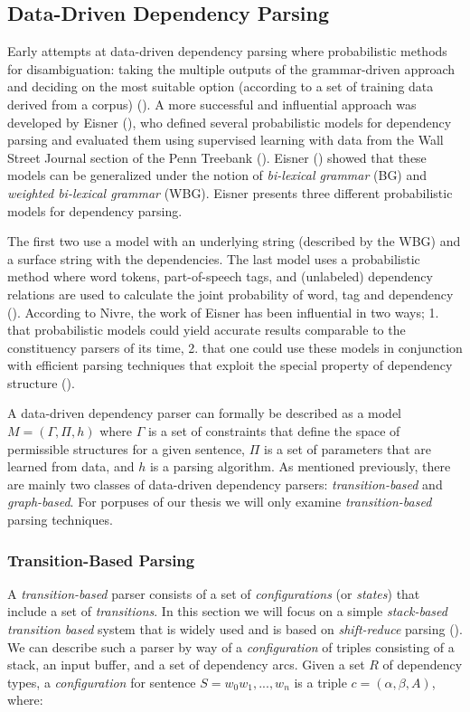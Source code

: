 \documentclass[10pt]{article}
\begin{document}
\subsection{Data-Driven Dependency Parsing}
Early attempts at data-driven dependency parsing where probabilistic methods for disambiguation: taking the multiple outputs of the grammar-driven approach and deciding on the most suitable option (according to a set of training data derived from a corpus) (\cite{Nivre05dependencygrammar}). A more successful and influential approach was developed by Eisner (\cite{eisner1996_a_empirical}), who defined several probabilistic models for dependency parsing and evaluated them using supervised learning with data from the Wall Street Journal section of the Penn Treebank (\cite{penn-treebank}). Eisner (\cite{eisner2000bilexical}) showed that these models can be generalized under the notion of \textit{bi-lexical grammar} (BG) and \textit{weighted bi-lexical grammar} (WBG). Eisner presents three different probabilistic models for dependency parsing.

The first two use a model with an underlying string (described by the WBG) and a surface string with the dependencies. The last model uses a probabilistic method where word tokens, part-of-speech tags, and (unlabeled) dependency relations are used to calculate the joint probability of word, tag and dependency (\cite{eisner2000bilexical}). According to Nivre, the work of Eisner has been influential in two ways; 1. that probabilistic models could yield accurate results comparable to the constituency parsers of its time, 2. that one could use these models in conjunction with efficient parsing techniques that exploit the special property of dependency structure (\cite{Nivre05dependencygrammar}).

A data-driven dependency parser can formally be described as a model $M = (\Gamma, \Pi, h)$ where $\Gamma$ is a set of constraints that define the space of permissible structures for a given sentence, $\Pi$ is a set of parameters that are learned from data, and $h$ is a parsing algorithm. As mentioned previously, there are mainly two classes of data-driven dependency parsers: \textit{transition-based} and \textit{graph-based}. For porpuses of our thesis we will only examine \textit{transition-based} parsing techniques.


\subsubsection{Transition-Based Parsing}
A \textit{transition-based} parser consists of a set of \textit{configurations} (or \textit{states}) that include a set of \textit{transitions}. In this section we will focus on a simple \textit{stack-based} \textit{transition based} system that is widely used and is based on \textit{shift-reduce} parsing (\cite{kubler-sandra-mcdonald-ryan-nivre-book}). We can describe such a parser by way of a \textit{configuration} of triples consisting of a stack, an input buffer, and a set of dependency arcs. Given a set $R$ of dependency types, a \textit{configuration} for sentence $S = w_0w_1, ..., w_n$ is a triple $c = (\alpha, \beta, A)$, where:
\end{document}

